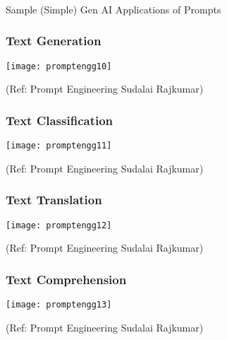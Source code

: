 
\begin{frame}[fragile]\frametitle{}
\begin{center}
{\Large Sample (Simple) Gen AI Applications of Prompts}
\end{center}
\end{frame}

\begin{frame}[fragile]\frametitle{Text Generation}

\begin{center}
\texttt{[image: promptengg10]}

{\tiny (Ref: Prompt Engineering Sudalai Rajkumar)}

\end{center}		
		


\end{frame}

\begin{frame}[fragile]\frametitle{Text Classification}

\begin{center}
\texttt{[image: promptengg11]}

{\tiny (Ref: Prompt Engineering Sudalai Rajkumar)}

\end{center}		
		


\end{frame}

\begin{frame}[fragile]\frametitle{Text Translation}

\begin{center}
\texttt{[image: promptengg12]}

{\tiny (Ref: Prompt Engineering Sudalai Rajkumar)}

\end{center}		
		


\end{frame}

\begin{frame}[fragile]\frametitle{Text Comprehension}

\begin{center}
\texttt{[image: promptengg13]}

{\tiny (Ref: Prompt Engineering Sudalai Rajkumar)}

\end{center}		
		


\end{frame}

